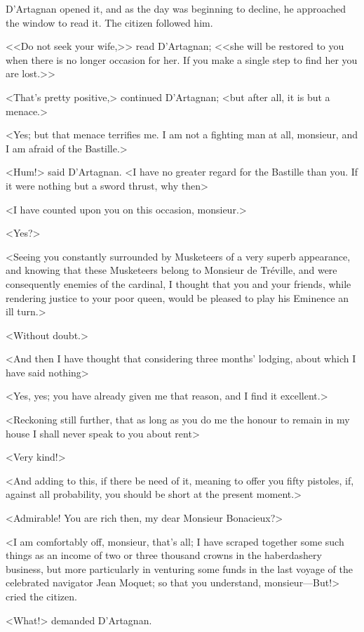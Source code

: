 D'Artagnan opened it, and as the day was beginning to decline, he approached the window to read it. The citizen followed him. 

<<Do not seek your wife,>> read D'Artagnan; <<she will be restored to you when there is no longer occasion for her. If you make a single step to find her you are lost.>>

<That's pretty positive,> continued D'Artagnan; <but after all, it is but a menace.> 

<Yes; but that menace terrifies me. I am not a fighting man at all, monsieur, and I am afraid of the Bastille.> 

<Hum!> said D'Artagnan. <I have no greater regard for the Bastille than you. If it were nothing but a sword thrust, why then\longdash> 

<I have counted upon you on this occasion, monsieur.> 

<Yes?> 

<Seeing you constantly surrounded by Musketeers of a very superb appearance, and knowing that these Musketeers belong to Monsieur de Tréville, and were consequently enemies of the cardinal, I thought that you and your friends, while rendering justice to your poor queen, would be pleased to play his Eminence an ill turn.> 

<Without doubt.> 

<And then I have thought that considering three months' lodging, about which I have said nothing\longdash> 

<Yes, yes; you have already given me that reason, and I find it excellent.> 

<Reckoning still further, that as long as you do me the honour to remain in my house I shall never speak to you about rent\longdash> 

<Very kind!> 

<And adding to this, if there be need of it, meaning to offer you fifty pistoles, if, against all probability, you should be short at the present moment.> 

<Admirable! You are rich then, my dear Monsieur Bonacieux?> 

<I am comfortably off, monsieur, that's all; I have scraped together some such things as an income of two or three thousand crowns in the haberdashery business, but more particularly in venturing some funds in the last voyage of the celebrated navigator Jean Moquet; so that you understand, monsieur—But!\longdash> cried the citizen. 

<What!> demanded D'Artagnan. 

